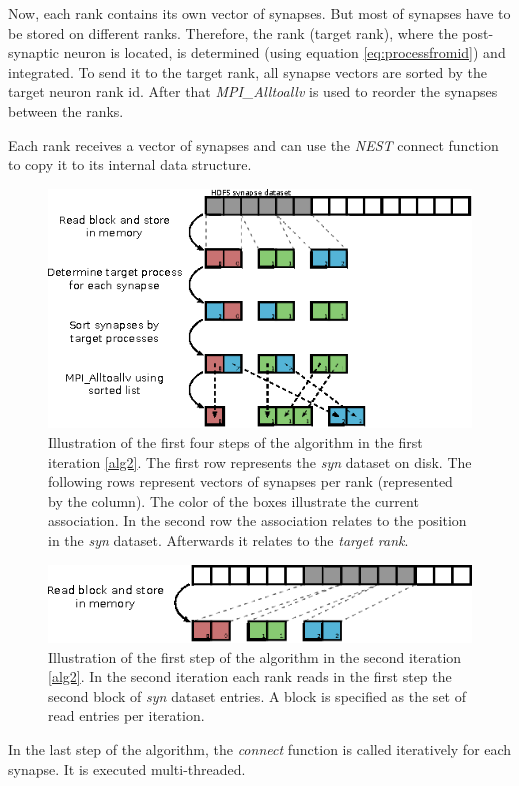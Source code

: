 Now, each rank contains its own vector of synapses.
But most of synapses have to be stored on different ranks.
Therefore, the rank (target rank), where the post-synaptic neuron is located, is determined (using equation \ref{eq:processfromid})
and integrated.
To send it to the target rank, all synapse vectors are sorted by the target neuron rank id.
After that \emph{MPI\_Alltoallv} is used to reorder the synapses between the ranks.

Each rank receives a vector of synapses and can use the \emph{NEST} connect function to copy it to its internal data structure.
\begin{figure}[ht!]
\centering
\includegraphics[scale=2.0]{pictures/import_syn_vis.eps}
\caption{Illustration of the first four steps of the algorithm in the first iteration \ref{alg2}.
The first row represents the \emph{syn} dataset on disk.
The following rows represent vectors of synapses per rank (represented by the column).
The color of the boxes illustrate the current association.
In the second row the association relates to the position in the \emph{syn} dataset.
Afterwards it relates to the \emph{target rank}.
}
\label{fig:importsynvis}
\end{figure}

\begin{figure}[ht!]
\centering
\includegraphics[scale=2.0]{pictures/import_syn_vis_second_it.eps}
\caption{Illustration of the first step of the algorithm in the second iteration \ref{alg2}.
In the second iteration each rank reads in the first step the second block of \emph{syn} dataset entries.
A block is specified as the set of read entries per iteration.}
\label{fig:importsynvis2nd}
\end{figure}
\newpage
In the last step of the algorithm, the \emph{connect} function is called iteratively for each synapse.
It is executed multi-threaded.

